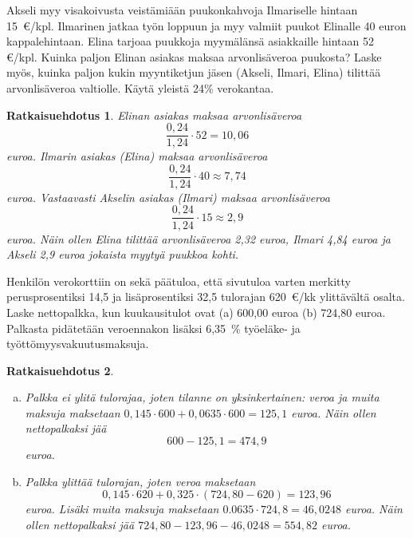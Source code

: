 \documentclass[a4paper,10pt]{article}\usepackage[]{graphicx}\usepackage[]{color}
\newtheorem*{ratk}{Ratkaisuehdotus}
\begin{document}
\begin{teht}
  Akseli myy visakoivusta veistämiään puukonkahvoja Ilmariselle hintaan 15~\euro/kpl. Ilmarinen jatkaa työn loppuun ja myy valmiit puukot Elinalle 40 euron kappalehintaan. Elina tarjoaa puukkoja myymälänsä asiakkaille hintaan 52 \euro/kpl. Kuinka paljon Elinan asiakas maksaa arvonlisäveroa puukosta? Laske myös, kuinka paljon kukin myyntiketjun jäsen (Akseli, Ilmari, Elina) tilittää arvonlisäveroa valtiolle. Käytä yleistä 24\% verokantaa.
\end{teht}
\begin{ratk}
  \newcommand{\alv}{\frac{0,24}{1,24}}
  Elinan asiakas maksaa arvonlisäveroa 
  \[
    \alv\cdot52 = 10{,}06
  \]
  euroa. Ilmarin asiakas (Elina) maksaa arvonlisäveroa 
  \[
    \alv\cdot40\approx7{,}74
  \]
  euroa. Vastaavasti Akselin asiakas (Ilmari) maksaa arvonlisäveroa
  \[
    \alv\cdot15\approx2{,}9
  \] euroa.
  Näin ollen Elina tilittää arvonlisäveroa 2{,}32 euroa, Ilmari 4{,}84 euroa ja Akseli 2{,}9 euroa jokaista myytyä puukkoa kohti.
\end{ratk}


\begin{teht}
Henkilön verokorttiin on sekä päätuloa, että sivutuloa varten merkitty perusprosentiksi 14,5 ja lisäprosentiksi 32,5 tulorajan 620~\euro/kk ylittävältä osalta. Laske nettopalkka, kun kuukausitulot ovat (a) 600,00 euroa (b) 724,80 euroa. Palkasta pidätetään veroennakon lisäksi 6,35~\% työeläke- ja työttömyysvakuutusmaksuja.
\end{teht}
\begin{ratk}

\begin{enumerate}[(a)]
		\item Palkka ei ylitä tulorajaa, joten tilanne on yksinkertainen: veroa ja muita maksuja maksetaan \(0,145\cdot600 + 0,0635\cdot600 = 125{,}1\) euroa. Näin ollen nettopalkaksi jää 
\[
	600-125{,}1 = 474{,}9	
\]
euroa. 
		\item Palkka ylittää tulorajan, joten veroa maksetaan
		\[
			0{,}145\cdot620 + 0{,}325\cdot (724,80-620) = 123{,}96
		\] euroa. Lisäki muita maksuja maksetaan
 \(0.0635\cdot724{,}8 = 46{,}0248\) euroa. Näin ollen nettopalkaksi jää \(724,80 - 123{,}96-46{,}0248 = 554{,}82\) euroa.
	\end{enumerate}
\end{ratk}
\end{document}

